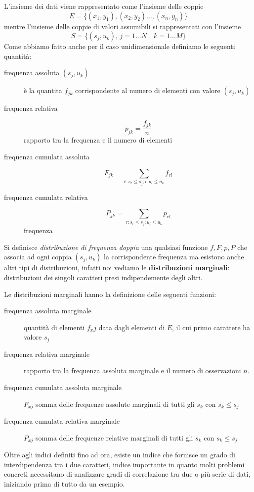 \documentclass[a4paper,12pt, oneside]{book}
\begin{document}
L'insieme dei dati viene rappresentato come l'insieme delle coppie
\[ E = \{(x_1, y_1), (x_2, y_2) \dots, (x_n, y_n)\} \]
mentre l'insieme delle coppie di valori assumibili si rappresentati con l'insieme
\[ S = \{(s_j, u_k), \, j = 1 \dots N \quad k = 1 \dots M\} \]
Come abbiamo fatto anche per il caso unidimensionale definiamo le seguenti quantità:
\begin{description}
    \item [frequenza assoluta $(s_j, u_k)$] è la quantita $f_{jk}$ corrispondente al numero di elementi con valore $(s_j, u_k)$
    \item [frequenza relativa] \[ p_{jk} = \frac{f_{jk}}{n} \] rapporto tra la frequenza e il numero di elementi
    \item [frequenza cumulata assoluta]  \[ F_{jk} = \sum _{r:s_r \leq s_j; l:u_l \leq u_k} f_{rl} \]
    \item [frequenza cumulata relativa] \[ P_{jk} = \sum _{r:s_r \leq s_j; u_l \leq u_k} p_{rl} \] frequenza 
\end{description}
Si definisce \emph{distribuzione di frequenza doppia} una qualsiasi funzione $f, F, p, P$ 
che associa ad ogni coppia $(s_j, u_k)$ la corrispondente frequenza ma esistono anche altri tipi di distribuzioni,
infatti noi vediamo le \textbf{distribuzioni marginali}: distribuzioni dei singoli caratteri presi indipendemente degli altri.

Le distribuzioni marginali hanno la definizione delle seguenti funzioni:
\begin{description}
    \item [frequenza assoluta marginale] quantità di elementi $f_xj$ data dagli elementi di $E$, il cui primo carattere ha valore $s_j$
    \item [frequenza relativa marginale] rapporto tra la frequenza assoluta marginale e il numero di osservazioni $n$.
    \item [frequenza cumulata assoluta marginale] $F_{xj}$ somma delle frequenze assolute marginali di tutti gli $s_k$ con $s_k \leq s_j$
    \item [frequenza cumulata relativa marginale] $P_{xj}$ somma delle frequenze relative marginali di tutti gli $s_k$ con $s_k \leq s_j$
\end{description}
Oltre agli indici definiti fino ad ora, esiste un indice che fornisce un grado di interdipendenza tra i due caratteri,
indice importante in quanto molti problemi concreti necessitano di analizzare gradi di correlazione tra due o più serie di dati,
iniziando prima di tutto da un esempio.
\end{document}
